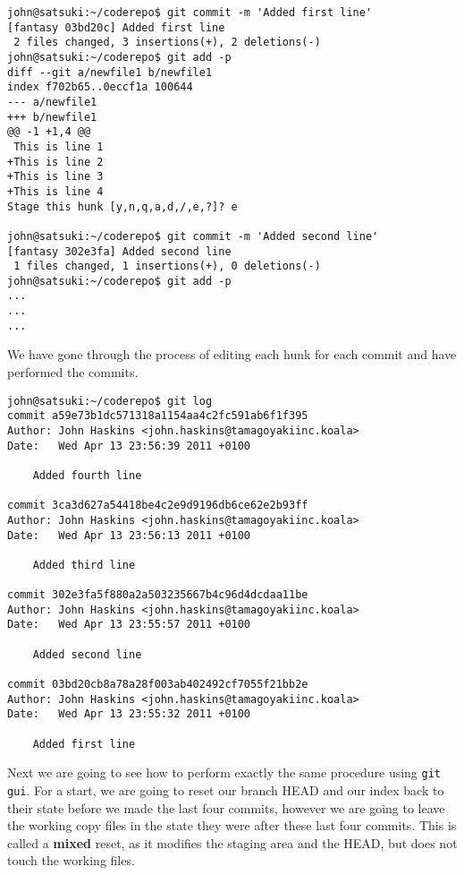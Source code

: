 \begin{Verbatim}[frame=leftline,framerule=1mm,fontsize=\relsize{-3}] 
john@satsuki:~/coderepo$ git commit -m 'Added first line'
[fantasy 03bd20c] Added first line
 2 files changed, 3 insertions(+), 2 deletions(-)
john@satsuki:~/coderepo$ git add -p
diff --git a/newfile1 b/newfile1
index f702b65..0eccf1a 100644
--- a/newfile1
+++ b/newfile1
@@ -1 +1,4 @@
 This is line 1
+This is line 2
+This is line 3
+This is line 4
Stage this hunk [y,n,q,a,d,/,e,?]? e

john@satsuki:~/coderepo$ git commit -m 'Added second line'
[fantasy 302e3fa] Added second line
 1 files changed, 1 insertions(+), 0 deletions(-)
john@satsuki:~/coderepo$ git add -p
...
...
...
\end{Verbatim}

We have gone through the process of editing each hunk for each commit and have performed the commits.  

\begin{Verbatim}[frame=leftline,framerule=1mm,fontsize=\relsize{-3}] 
john@satsuki:~/coderepo$ git log
commit a59e73b1dc571318a1154aa4c2fc591ab6f1f395
Author: John Haskins <john.haskins@tamagoyakiinc.koala>
Date:   Wed Apr 13 23:56:39 2011 +0100

    Added fourth line

commit 3ca3d627a54418be4c2e9d9196db6ce62e2b93ff
Author: John Haskins <john.haskins@tamagoyakiinc.koala>
Date:   Wed Apr 13 23:56:13 2011 +0100

    Added third line

commit 302e3fa5f880a2a503235667b4c96d4dcdaa11be
Author: John Haskins <john.haskins@tamagoyakiinc.koala>
Date:   Wed Apr 13 23:55:57 2011 +0100

    Added second line

commit 03bd20cb8a78a28f003ab402492cf7055f21bb2e
Author: John Haskins <john.haskins@tamagoyakiinc.koala>
Date:   Wed Apr 13 23:55:32 2011 +0100

    Added first line
\end{Verbatim}

Next we are going to see how to perform exactly the same procedure using \texttt{git gui}.  For a start, we are going to reset our branch HEAD and our index back to their state before we made the last four commits, however we are going to leave the working copy files in the state they were after these last four commits.  This is called a \textbf{mixed} reset, as it modifies the staging area and the HEAD, but does not touch the working files.

